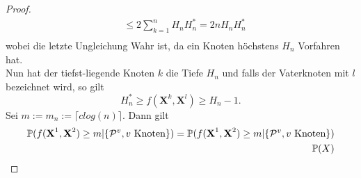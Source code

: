 \begin{proof}
\begin{align*}
    &\leq 2\sum_{k=1}^{n}H_nH_n^*  = 2nH_nH_n^*\\
\end{align*}
wobei die letzte Ungleichung Wahr ist, da ein Knoten höchstens $H_n$ Vorfahren hat. \\
Nun hat der tiefst-liegende Knoten $k$ die Tiefe $H_n$ und falls der Vaterknoten mit $l$ bezeichnet wird, so gilt 
\[
    H^*_n \geq f(\textbf{X}^k,\textbf{X}^l) \geq H_n - 1.
\]
Sei $m := m_n := \lceil c log(n) \rceil$. Dann gilt 
\begin{align*}
\mathbb{P}(f(\textbf{X}^1,\textbf{X}^2)\geq m| \{\mathcal{P}^v, v \textnormal{ Knoten}\}) = \mathbb{P}(f(\textbf{X}^1,\textbf{X}^2)\geq m| \{\mathcal{P}^v, v \textnormal{ Knoten}\}) \\
\mathbb{P}(X)
\end{align*}
\end{proof}
